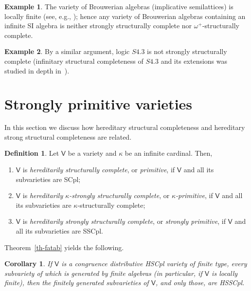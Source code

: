 \documentclass[submission,copyright,creativecommons]{eptcs}
\newtheorem{cor}[theorem]{Corollary}
\theoremstyle{definition}
\newtheorem{definition}{Definition}
\newtheorem{example}{Example}
\newcommand{\vv}[1]{\mathsf {#1}}
\newcommand{\vV}{\vv V}
\newcommand{\Def}[1]{\textit{#1}}
\newcommand{\kk}{\kappa}
\begin{document}
\begin{example}
	The variety of Brouwerian algebras (implicative semilattices) is locally finite (see, e.g., \cite{KohlerBrouwerian1981}); hence any variety of Brouwerian algebras containing an infinite SI algebra is neither strongly structurally complete nor $\omega^+$-structurally complete.
\end{example}

\begin{example}
	By a similar argument, logic $S4.3$ is not strongly structurally complete (infinitary structural completeness of $S4.3$ and its extensions was studied in depth in~\cite{DzikWojtylakAlmost2015}).
\end{example}

\section{Strongly primitive varieties}\label{sec-primitive}

In this section we discuss how hereditary structural completeness and hereditary strong structural completeness are related.

\begin{definition}
	Let $\vV$ be a variety and $\kk$ be an infinite cardinal. Then,
	\begin{enumerate}
		\item[] $\vv V$ is \Def{hereditarily structurally complete}, or \Def{primitive}, if $\vv V$ and all its subvarieties are SCpl;
		
		\item[] $\vv V$ is \Def{hereditarily $\kk$-strongly structurally complete}, or \Def{$\kk$-primitive}, if $\vv V$ and all its subvarieties are $\kk$-structurally complete;
		
		\item[] $\vv V$ is \Def{hereditarily strongly structurally complete}, or \Def{strongly primitive}, if $\vv V$ and all its subvarieties are SSCpl.
	\end{enumerate}
\end{definition}

Theorem~\ref{th-fatab} yields the following.

\begin{cor}\label{cor-superpr}
	If $\vv V$ is a congruence distributive HSCpl variety of finite type, every subvariety of which is generated by finite algebras (in particular, if $\vv V$ is locally finite), then the finitely generated subvarieties of $\vv V$, and only those, are HSSCpl.
\end{cor}
\end{document}
